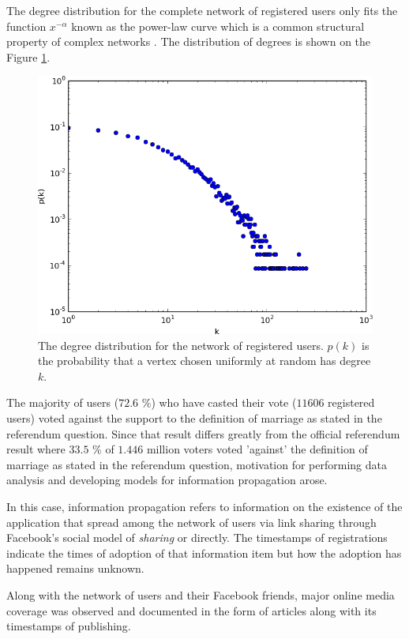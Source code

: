 \documentclass[times, utf8, zavrsni]{fer}
\begin{document}
The degree distribution for the complete network of registered users only fits the function $x^{-\alpha}$ known as the power-law curve which is a common structural property of complex networks \cite{Newman03thestructure}. The distribution of degrees is shown on the Figure \ref{degs}.

\begin{figure}[htp]
\centering
\includegraphics[scale=0.6]{log_mali.png}	
\caption{The degree distribution for the network of registered users. $p(k)$ is the probability that a vertex chosen uniformly at random has degree $k$.}
\label{degs}
\end{figure}

 The majority of users ($72.6$ \%)  who have casted their vote ($11606$ registered users) voted against the support to the definition of marriage as stated in the referendum question. Since that result differs greatly from the official referendum result where $33.5$ \% of $1.446$ million voters voted 'against' the definition of marriage as stated in the referendum question, motivation for performing data analysis and developing models for information propagation arose. 
 
 In this case, information propagation refers to  information on the existence of the application that  spread among the network of users via link sharing through Facebook's social model of \emph{sharing} or directly. The timestamps of registrations indicate the times of adoption of that information item but how the adoption has happened remains unknown.  
   
 Along with the network of users and their Facebook friends, major online media coverage was observed and documented in the form of articles  along with its timestamps of publishing.
 
\end{document}
